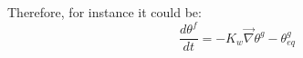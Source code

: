 Therefore, for instance it could be:
\begin{equation}
\frac{d \theta^f}{dt} = - K_w \vec{\nabla}{\theta^g - \theta^g_{eq}}
\end{equation}